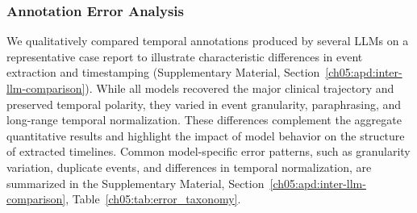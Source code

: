 \subsubsection{Annotation Error Analysis}
We qualitatively compared temporal annotations produced by several LLMs on a representative case report to illustrate characteristic differences in event extraction and timestamping (Supplementary Material, Section~\ref{ch05:apd:inter-llm-comparison}).
While all models recovered the major clinical trajectory and preserved temporal polarity, they varied in
event granularity, paraphrasing, and long-range temporal normalization.
These differences complement the aggregate quantitative results and highlight the impact of model behavior on the structure of extracted timelines.
Common model-specific error patterns, such as granularity variation, duplicate events, and differences in temporal normalization, are summarized in the Supplementary Material, Section~\ref{ch05:apd:inter-llm-comparison}, Table~\ref{ch05:tab:error_taxonomy}.

